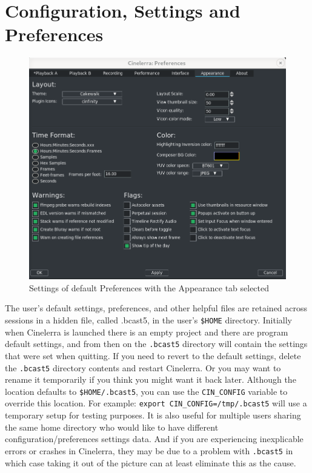 
\chapter{Configuration, Settings and Preferences}%
\label{cha:configuration_settings_preferences}

\begin{figure}[htpb]
    \centering \includegraphics[width=0.9\linewidth]{images/settings.png}
    \caption{Settings of default Preferences with the Appearance tab selected}
    \label{fig:settings}
\end{figure}

The user's default settings, preferences, and other helpful files are retained across sessions in a hidden file, called .bcast5, in the user’s \texttt{\$HOME} directory. Initially when Cinelerra is launched there is an empty project and there are program default settings, and from then on the \texttt{.bcast5} directory will contain the settings that were set when quitting.  If you need to revert to the default settings, delete the \texttt{.bcast5} directory contents and restart Cinelerra.  Or you may want to rename it temporarily if you think you might want it back later.
Although the location defaults to \texttt{\$HOME/.bcast5}, you can use the \texttt{CIN\_CONFIG} variable to override this location.  For example:  \texttt{export CIN\_CONFIG=/tmp/.bcast5}  will use a temporary setup for testing purposes.  It is also useful for multiple users sharing the same home directory who would like to have different configuration/preferences settings data.  And if you are experiencing inexplicable errors or crashes in Cinelerra, they may be due to a problem with \texttt{.bcast5} in which case taking it out of the picture  can at least eliminate this as the cause.


